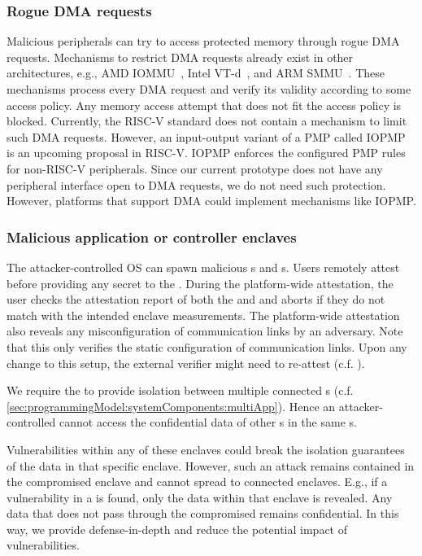 \subsubsection{Rogue DMA requests}
Malicious peripherals can try to access protected memory through rogue DMA requests. 
Mechanisms to restrict DMA requests already exist in other architectures, e.g., AMD IOMMU~\cite{amd2007iommu}, Intel VT-d~\cite{abramson2006vtd}, and ARM SMMU~\cite{arm2013smmu}. These mechanisms process every DMA request and verify its validity according to some access policy. Any memory access attempt that does not fit the access policy is blocked. Currently, the RISC-V standard does not contain a mechanism to limit such DMA requests. However, an input-output variant of a PMP called IOPMP~\cite{IOPMP} is an upcoming proposal in RISC-V. IOPMP enforces the configured PMP rules for non-RISC-V peripherals. Since our current prototype does not have any peripheral interface open to DMA requests, we do not need such protection. However, platforms that support DMA could implement mechanisms like IOPMP.

\subsubsection{Malicious application or controller enclaves}
The attacker-controlled OS can spawn malicious \app{}s and \ce{}s. Users remotely attest before providing any secret to the \app. During the platform-wide attestation, the user checks the attestation report of both the \app and \ce and aborts if they do not match with the intended enclave measurements. The platform-wide attestation also reveals any misconfiguration of communication links by an adversary. Note that this only verifies the static configuration of communication links. Upon any change to this setup, the external verifier might need to re-attest (c.f. ). 

We require the \ce{} to provide isolation between multiple connected \app{}s (c.f. \ref{sec:programmingModel:systemComponents:multiApp}). Hence an attacker-controlled \app cannot access the confidential data of other \app{}s in the same \ce{}s.

Vulnerabilities within any of these enclaves could break the isolation guarantees of the data in that specific enclave. However, such an attack remains contained in the compromised enclave and cannot spread to connected enclaves. E.g., if a vulnerability in a \ce{} is found, only the data within that enclave is revealed. Any data that does not pass through the compromised \ce remains confidential. In this way, we provide defense-in-depth and reduce the potential impact of vulnerabilities.

